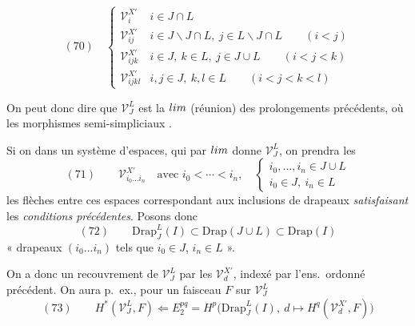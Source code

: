 \documentclass[11pt,a4paper]{article}
\begin{document}

\[
(70)\quad
\begin{cases}
\mathcal V^{X'}_i & i\in J\cap L\\
\mathcal V^{X'}_{ij} & i\in J\smallsetminus J\cap L,\ j\in L\smallsetminus J\cap L \qquad (i<j)\\
\mathcal V^{X'}_{ijk} & i\in J,\ k\in L,\ j\in J\cup L \qquad (i<j<k)\\
\mathcal V^{X'}_{ijkl} & i,j\in J,\ k,l\in L \qquad (i<j<k<l)
\end{cases}
\]


On peut donc dire que $\mathcal V^L_J$ est la $\varinjlim$ (réunion) des prolongements précédents, où \ill{} \struck{\ill{}}  les morphismes semi-simpliciaux .

 Si on \ill{}  dans un système  d'espaces, qui par  $\varinjlim$ donne $\mathcal V^L_J$, on prendra les
\[
(71)\qquad \mathcal V^{X'}_{i_0\ldots i_n}\quad\text{avec } i_0<\cdots<i_n,\quad
\begin{cases} i_0,\ldots,i_n\in J\cup L\\ i_0\in J,\ i_n\in L\end{cases}
\]
\struck{\ill{} \ill{} \ill{}} les flèches entre ces espaces correspondant aux inclusions de drapeaux \emph{satisfaisant} les \emph{conditions précédentes}. Posons donc
\[
(72)\qquad \mathrm{Drap}^L_J(I)\subset\mathrm{Drap}(J\cup L)\subset\mathrm{Drap}(I)
\]
« drapeaux $(i_0\ldots i_n)$ tels que $i_0\in J$, $i_n\in L$ ».

On a donc un recouvrement de $\mathcal V^L_J$ par les $\mathcal V^{X'}_d$, indexé par l'ens.\ ordonné précédent. On aura p.\ ex., pour un faisceau $F$ sur $\mathcal V^L_J$
\[
(73)\qquad H^{*}(\mathcal V^L_J,F)\Longleftarrow E_2^{pq}=H^p\big(\mathrm{Drap}^L_J(I),\ d\mapsto H^q(\mathcal V^{X'}_d,F)\big)
\]
\end{document}
